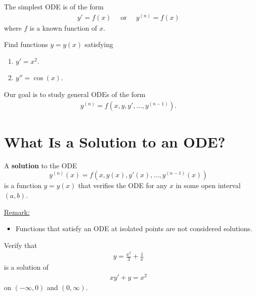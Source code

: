\documentclass[12pt,a4paper]{article}
\newcounter{example}[section]
\begin{document}
\vspace*{16pt}

The simplest ODE is of the form
	\begin{align*}
	y' = f(x) \quad \text{ or } \quad y^{(n)} = f(x)
	\end{align*}
where $f$ is a known function of $x$.

\vspace*{10pt}

\begin{example}
Find functions $y = y (x)$ satisfying
	\begin{enumerate}
	\item $y' = x^2$.
	\item $y'' = \cos (x)$.
	\end{enumerate}
\end{example}

\vfill

Our goal is to study general ODEs of the form
	\begin{align*}
	y^{(n)} = f(x, y, y' , \ldots , y^{(n-1)}) .
	\end{align*}
	
\newpage

\section{What Is a Solution to an ODE?}

A \textbf{solution} to the ODE 
	$$
	y^{(n)} (x) = f(x, y(x), y'(x), \ldots , y^{(n-1)}(x))
	$$
is a function $y = y(x)$ that verifies the ODE for any $x$ in some open interval $(a, b)$.

	\vspace*{10pt}
	\underline{Remark:} 
	
	\begin{itemize}
	\item Functions that satisfy an ODE at isolated points are not considered solutions.
	\end{itemize}
	
\vspace*{16pt}
	
\begin{example}\label{Ex:SolutionODE}
Verify that
	\begin{align*}
	y = \frac{x^2}{3} + \frac{1}{x}
	\end{align*}
is a solution of
	\begin{align*}
	xy' + y = x^2
	\end{align*}
on $(-\infty , 0)$ and $(0, \infty )$.
\end{example}
\end{document}
